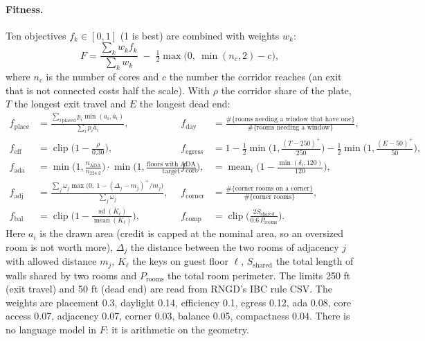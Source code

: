\documentclass[10pt]{article}
\begin{document}
\paragraph{Fitness.} Ten objectives $f_k \in [0,1]$ (1 is best) are combined with weights $w_k$:
\[ F = \frac{\sum_k w_k f_k}{\sum_k w_k} \; - \; \tfrac12 \max\!\big(0,\ \min(n_c, 2) - c\big), \]
where $n_c$ is the number of cores and $c$ the number the corridor reaches (an exit that is not connected costs half the
scale). With $\rho$ the corridor share of the plate, $T$ the longest exit travel and $E$ the longest dead end:
\begin{align*}
f_{\text{place}} &= \frac{\sum_{i\ \text{placed}} p_i \min(a_i, \bar a_i)}{\sum_{i} p_i \bar a_i}, &
f_{\text{day}} &= \frac{\#\{\text{rooms needing a window that have one}\}}{\#\{\text{rooms needing a window}\}}, \\
f_{\text{eff}} &= \operatorname{clip}\!\Big(1 - \frac{\rho}{0.30}\Big), &
f_{\text{egress}} &= 1 - \tfrac12 \min\!\Big(1, \frac{(T - 250)^+}{250}\Big) - \tfrac12 \min\!\Big(1, \frac{(E - 50)^+}{50}\Big), \\
f_{\text{ada}} &= \min\!\Big(1, \frac{n_{\text{ADA}}}{n_{224.2}}\Big)\cdot\min\!\Big(1, \frac{\text{floors with ADA}}{\text{target}}\Big), &
f_{\text{core}} &= \operatorname{mean}_i \Big(1 - \frac{\min(\delta_i, 120)}{120}\Big), \\
f_{\text{adj}} &= \frac{\sum_j \omega_j \max\big(0,\ 1 - (\Delta_j - m_j)^+/m_j\big)}{\sum_j \omega_j}, &
f_{\text{corner}} &= \frac{\#\{\text{corner rooms on a corner}\}}{\#\{\text{corner rooms}\}}, \\
f_{\text{bal}} &= \operatorname{clip}\!\Big(1 - \frac{\operatorname{sd}(K_\ell)}{\operatorname{mean}(K_\ell)}\Big), &
f_{\text{comp}} &= \operatorname{clip}\!\Big(\frac{2 S_{\text{shared}}}{0.6\, P_{\text{rooms}}}\Big).
\end{align*}
Here $a_i$ is the drawn area (credit is capped at the nominal area, so an oversized room is not worth more),
$\Delta_j$ the distance between the two rooms of adjacency $j$ with allowed distance $m_j$, $K_\ell$ the keys on guest floor
$\ell$, $S_{\text{shared}}$ the total length of walls shared by two rooms and $P_{\text{rooms}}$ the total room perimeter.
The limits 250 ft (exit travel) and 50 ft (dead end) are read from RNGD's IBC rule CSV. The weights are
placement 0.3, daylight 0.14, efficiency 0.1, egress 0.12, ada 0.08, core access 0.07, adjacency 0.07, corner 0.03, balance 0.05, compactness 0.04. There is no language model in $F$: it is arithmetic on the geometry.
\end{document}
